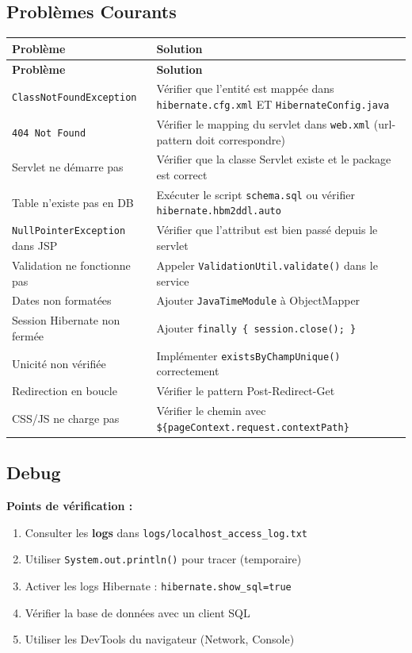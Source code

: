 \documentclass[12pt,a4paper]{article}
\begin{document}
\subsection{Problèmes Courants}

\begin{longtable}{|p{5cm}|p{9cm}|}
\hline
\textbf{Problème} & \textbf{Solution} \\
\hline
\endfirsthead
\hline
\textbf{Problème} & \textbf{Solution} \\
\hline
\endhead
\texttt{ClassNotFoundException} & Vérifier que l'entité est mappée dans \texttt{hibernate.cfg.xml} ET \texttt{HibernateConfig.java} \\
\hline
\texttt{404 Not Found} & Vérifier le mapping du servlet dans \texttt{web.xml} (url-pattern doit correspondre) \\
\hline
Servlet ne démarre pas & Vérifier que la classe Servlet existe et le package est correct \\
\hline
Table n'existe pas en DB & Exécuter le script \texttt{schema.sql} ou vérifier \texttt{hibernate.hbm2ddl.auto} \\
\hline
\texttt{NullPointerException} dans JSP & Vérifier que l'attribut est bien passé depuis le servlet \\
\hline
Validation ne fonctionne pas & Appeler \texttt{ValidationUtil.validate()} dans le service \\
\hline
Dates non formatées & Ajouter \texttt{JavaTimeModule} à ObjectMapper \\
\hline
Session Hibernate non fermée & Ajouter \texttt{finally \{ session.close(); \}} \\
\hline
Unicité non vérifiée & Implémenter \texttt{existsByChampUnique()} correctement \\
\hline
Redirection en boucle & Vérifier le pattern Post-Redirect-Get \\
\hline
CSS/JS ne charge pas & Vérifier le chemin avec \texttt{\$\{pageContext.request.contextPath\}} \\
\hline
\end{longtable}

\subsection{Debug}

\textbf{Points de vérification :}
\begin{enumerate}
    \item Consulter les \textbf{logs} dans \texttt{logs/localhost\_access\_log.txt}
    \item Utiliser \texttt{System.out.println()} pour tracer (temporaire)
    \item Activer les logs Hibernate : \texttt{hibernate.show\_sql=true}
    \item Vérifier la base de données avec un client SQL
    \item Utiliser les DevTools du navigateur (Network, Console)
\end{enumerate}
\end{document}
